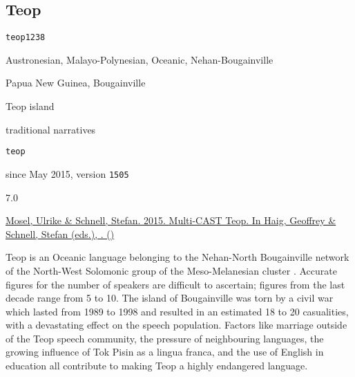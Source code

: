 \subsection{Teop}
\label{ssec:corpus-teop}

\noindent{}

\begin{description}[labelwidth=6.5em,itemindent=0em,itemsep=0.25mm]
	\TabPositions{2em}
	\raggedright\small
	\item[glottocode]		\texttt{teop1238}
	\item[affiliation]		Austronesian, Malayo-Polynesian, Oceanic, Nehan-Bougainville
	\item[area spoken]		Papua New Guinea, Bougainville
	\item[varieties rec'd]	Teop island
	\item[text types]		traditional narratives
	\item[sources]		
	\medskip
	\item[identifier]		\texttt{teop}
	\item[availability]		since May 2015, version \texttt{1505}
	\item[GRAID]		7.0		
	\item[RefIND]		\checkyes{}	
	\item[ISNRef]		\checkyes{}	
	\item[citation]		\hyperref[ssec:references-mc]{Mosel, Ulrike \& Schnell, Stefan. 2015. Multi-CAST Teop. In Haig, Geoffrey \& Schnell, Stefan (eds.), . ()} \nocite{Mosel.Schnell2015}
\end{description}

\noindent Teop is an Oceanic language belonging to the Nehan-North Bougainville network of the North-West Solomonic group of the Meso-Melanesian cluster . Accurate figures for the number of speakers are difficult to ascertain; figures from the last decade range from 5 to 10. The island of Bougainville was torn by a civil war which lasted from 1989 to 1998 and resulted in an estimated 18 to 20 casualities, with a devastating effect on the speech population. Factors like marriage outside of the Teop speech community, the pressure of neighbouring languages, the growing influence of Tok Pisin as a lingua franca, and the use of English in education all contribute to making Teop a highly endangered language.

